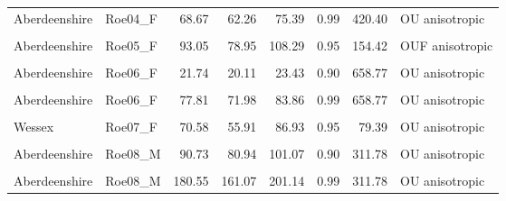 \documentclass[10pt,a4paper]{article}
\begin{document}
\begin{longtable}[t]{llrrrrrl}
Aberdeenshire & Roe04\_F & 68.67 & 62.26 & 75.39 & 0.99 & 420.40 & OU anisotropic\\
\cellcolor{gray!10}{Aberdeenshire} & \cellcolor{gray!10}{Roe05\_F} & \cellcolor{gray!10}{74.51} & \cellcolor{gray!10}{63.22} & \cellcolor{gray!10}{86.71} & \cellcolor{gray!10}{0.90} & \cellcolor{gray!10}{154.42} & \cellcolor{gray!10}{OUF anisotropic}\\
Aberdeenshire & Roe05\_F & 93.05 & 78.95 & 108.29 & 0.95 & 154.42 & OUF anisotropic\\
\cellcolor{gray!10}{Aberdeenshire} & \cellcolor{gray!10}{Roe05\_F} & \cellcolor{gray!10}{130.88} & \cellcolor{gray!10}{111.05} & \cellcolor{gray!10}{152.32} & \cellcolor{gray!10}{0.99} & \cellcolor{gray!10}{154.42} & \cellcolor{gray!10}{OUF anisotropic}\\
\addlinespace
Aberdeenshire & Roe06\_F & 21.74 & 20.11 & 23.43 & 0.90 & 658.77 & OU anisotropic\\
\cellcolor{gray!10}{Aberdeenshire} & \cellcolor{gray!10}{Roe06\_F} & \cellcolor{gray!10}{32.19} & \cellcolor{gray!10}{29.78} & \cellcolor{gray!10}{34.69} & \cellcolor{gray!10}{0.95} & \cellcolor{gray!10}{658.77} & \cellcolor{gray!10}{OU anisotropic}\\
Aberdeenshire & Roe06\_F & 77.81 & 71.98 & 83.86 & 0.99 & 658.77 & OU anisotropic\\
\cellcolor{gray!10}{Wessex} & \cellcolor{gray!10}{Roe07\_F} & \cellcolor{gray!10}{57.83} & \cellcolor{gray!10}{45.81} & \cellcolor{gray!10}{71.22} & \cellcolor{gray!10}{0.90} & \cellcolor{gray!10}{79.39} & \cellcolor{gray!10}{OU anisotropic}\\
Wessex & Roe07\_F & 70.58 & 55.91 & 86.93 & 0.95 & 79.39 & OU anisotropic\\
\addlinespace
\cellcolor{gray!10}{Wessex} & \cellcolor{gray!10}{Roe07\_F} & \cellcolor{gray!10}{95.50} & \cellcolor{gray!10}{75.65} & \cellcolor{gray!10}{117.62} & \cellcolor{gray!10}{0.99} & \cellcolor{gray!10}{79.39} & \cellcolor{gray!10}{OU anisotropic}\\
Aberdeenshire & Roe08\_M & 90.73 & 80.94 & 101.07 & 0.90 & 311.78 & OU anisotropic\\
\cellcolor{gray!10}{Aberdeenshire} & \cellcolor{gray!10}{Roe08\_M} & \cellcolor{gray!10}{118.77} & \cellcolor{gray!10}{105.95} & \cellcolor{gray!10}{132.31} & \cellcolor{gray!10}{0.95} & \cellcolor{gray!10}{311.78} & \cellcolor{gray!10}{OU anisotropic}\\
Aberdeenshire & Roe08\_M & 180.55 & 161.07 & 201.14 & 0.99 & 311.78 & OU anisotropic\\

\end{longtable}
\end{document}
